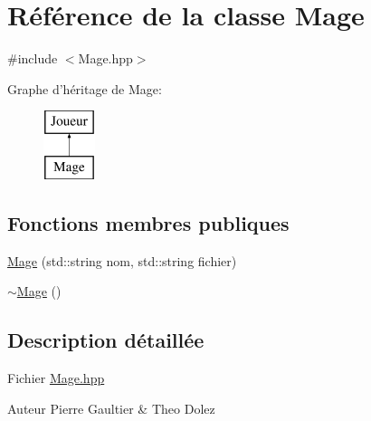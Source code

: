 \hypertarget{class_mage}{\section{\-Référence de la classe \-Mage}
\label{class_mage}
}


{\ttfamily \#include $<$\-Mage.\-hpp$>$}

\-Graphe d'héritage de \-Mage\-:\begin{figure}[H]
\begin{center}
\leavevmode
\includegraphics[height=2.000000cm]{class_mage}
\end{center}
\end{figure}
\subsection*{\-Fonctions membres publiques}
\begin{DoxyCompactItemize}
\item 
\hyperlink{class_mage_afd12913f92aeb59dceb83ad1d6753ae9}{\-Mage} (std\-::string nom, std\-::string fichier)
\item 
\hyperlink{class_mage_a0a3f693b67379cde4fcf2fa1622211ca}{$\sim$\-Mage} ()
\end{DoxyCompactItemize}


\subsection{\-Description détaillée}
\-Fichier \hyperlink{_mage_8hpp}{\-Mage.\-hpp} \begin{DoxyAuthor}{\-Auteur}
\-Pierre \-Gaultier \& \-Theo \-Dolez 
\end{DoxyAuthor}


